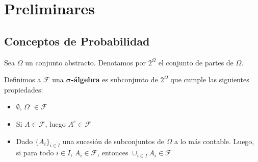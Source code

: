 
\chapter{Preliminares}

\section{Conceptos de Probabilidad}

Sea $\Omega$ un conjunto abstracto. Denotamos por $2^{\Omega}$ el conjunto de partes de $\Omega$.

\begin{boxDef}
Definimos a $\mathcal{F}$ una $\mathbf{\sigma}$\textbf{-álgebra} es subconjunto de $2^{\Omega}$ que cumple las siguientes propiedades:

	\begin{itemize}
		\item $\emptyset$, $\Omega$ $\in \mathcal{F}$
		\item Si $A \in \mathcal{F}$, luego $A^{c} \in \mathcal{F}$
		\item Dado $\{ A_i \}_{i \in I}$ una sucesión de subconjuntos de $\Omega$ a lo más contable. Luego, si para todo $i \in I$, $A_i \in \mathcal{F}$, entonces $\cup_{i \in I} A_i \in \mathcal{F}$ 
	\end{itemize}


\end{boxDef}